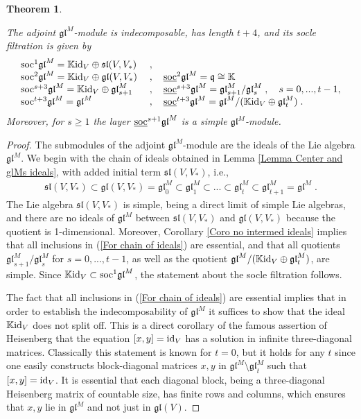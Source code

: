 \documentclass[12pt]{article}
\def\KK {{\mathbb K}}     %
\def\mk {\mathfrak}
\def\ul  {\underline}
\newtheorem{theorem}{Theorem}[section]
\begin{document}
\begin{theorem}\label{Theo socfil glM}

The adjoint $\mk{gl}^M$-module is indecomposable, has length $t+4$, and its socle filtration is given by
\begin{gather*}
\begin{array}{ll}
{\rm soc}^1\mk{gl}^M  = \KK{\rm id}_V\oplus \mk{sl}(V,V_*) &\;,  \\
{\rm soc}^2\mk{gl}^M = \KK{\rm id}_V\oplus \mk{gl}(V,V_*) & \;,\quad \ul{\rm soc}^2\mk{gl}^M  = \mk{q} \cong \KK \\
{\rm soc}^{s+3}\mk{gl}^M = \KK{\rm id}_V\oplus \mk{gl}^M_{s+1} &\;,\quad \ul{\rm soc}^{s+3}\mk{gl}^M  = \mk{gl}^M_{s+1}/\mk{gl}^M_{s} \;, \quad s=0,...,t-1,\\
{\rm soc}^{t+3}\mk{gl}^M = \mk{gl}^M &\;,\quad \ul{\rm soc}^{t+3}\mk{gl}^M  = \mk{gl}^M/(\KK{\rm id}_V\oplus\mk{gl}^M_{t}) \;.
\end{array}
\end{gather*}
Moreover, for $s\geq 1$ the layer $\ul{\rm soc}^{s+1}\mk{gl}^M$ is a simple $\mk{gl}^M$-module.
\end{theorem}

\begin{proof}
The submodules of the adjoint $\mk{gl}^M$-module are the ideals of the Lie algebra $\mk{gl}^M$. We begin with the chain of ideals obtained in Lemma \ref{Lemma Center and glMs ideals}, with added initial term $\mk{sl}(V,V_*)$, i.e.,
\begin{gather}\label{For chain of ideals}
\mk{sl}(V,V_*)\subset\mk{gl}(V,V_*)=\mk{gl}^M_0\subset\mk{gl}^M_1\subset ...\subset\mk{gl}^M_{t}\subset \mk{gl}^M_{t+1}=\mk{gl}^M\;.
\end{gather}
The Lie algebra $\mk{sl}(V,V_*)$ is simple, being a direct limit of simple Lie algebras, and there are no ideals of $\mk{gl}^M$ between $\mk{sl}(V,V_*)$ and $\mk{gl}(V,V_*)$ because the quotient is 1-dimensional. Moreover, Corollary \ref{Coro no intermed ideals} implies that all  inclusions in (\ref{For chain of ideals}) are essential, and that all quotients $\mk{gl}^M_{s+1}/\mk{gl}^M_{s}$ for $s=0,...,t-1$, as well as the quotient $\mk{gl}^M/(\KK{\rm id}_V\oplus\mk{gl}^M_{t})$, are simple. Since $\KK{\rm id}_V\subset {\rm soc}^1\mk{gl}^M$, the statement about the socle filtration follows.

The fact that all inclusions in (\ref{For chain of ideals}) are essential implies that in order to establish the indecomposability of $\mk{gl}^M$ it suffices to show that the ideal $\KK{\rm id}_V$ does not split off. This is a direct corollary of the famous assertion of Heisenberg that the equation $[x,y]={\rm id}_V$ has a solution in infinite three-diagonal matrices. Classically this statement is known for $t=0$, but it holds for any $t$ since one easily constructs block-diagonal matrices $x,y$ in $\mk{gl}^M\setminus\mk{gl}^M_{t}$ such that $[x,y]={\rm id}_V$. It is essential that each diagonal block, being a three-diagonal Heisenberg matrix of countable size, has finite rows and columns, which ensures that $x,y$ lie in $\mk{gl}^M$ and not just in $\mk{gl}(V)$.
\end{proof}
\end{document}

